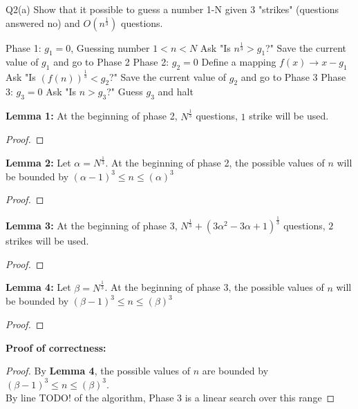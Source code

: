 \begin{problem}
  {Q2(a)}
  Show that it possible to guess a number 1-N given 3 "strikes" (questions answered no) and $O(n^{\frac{1}{3}})$ questions. \\
  \begin{algorithmic}[1]
    \STATE Phase 1: $g_1 = 0$, Guessing number $1 < n < N$
    \STATE Ask "Is $ n^{\frac{1}{3}} > g_1$?"
    \STATE Save the current value of $g_1$ and go to Phase 2
    \ENDIF
    \ENDFOR
    \STATE Phase 2: $g_2 = 0$
    \STATE Define a mapping $f(x) \rightarrow x - g_1$
    \STATE Ask "Is $(f(n))^{\frac{1}{3}} < g_2$?"
    \STATE Save the current value of $g_2$ and go to Phase 3
    \ENDIF
    \ENDFOR
    \STATE Phase 3: $g_3 = 0$
    \STATE Ask "Is $n > g_3$?"
    \STATE Guess $g_3$ and halt
    \ENDIF
    \ENDFOR
  \end{algorithmic}
  \textbf{Lemma 1:} At the beginning of phase 2, $N^{\frac{1}{3}}$ questions, $1$ strike will be used. \\
  \begin{proof}
  \end{proof}
  \textbf{Lemma 2:} Let $\alpha = N^{\frac{1}{3}}$. At the beginning of phase 2, the possible values of $n$ will be bounded by $(\alpha - 1)^3 \leq n \leq (\alpha)^3$ \\
  \begin{proof}
  \end{proof}
  \textbf{Lemma 3:} At the beginning of phase 3, $N^{\frac{1}{3}} + (3\alpha^2 - 3\alpha + 1)^{\frac{1}{3}}$ questions, $2$ strikes will be used. \\
  \begin{proof}
  \end{proof}
  \textbf{Lemma 4:} Let $\beta = N^{\frac{1}{3}}$. At the beginning of phase 3, the possible values of $n$ will be bounded by $(\beta - 1)^3 \leq n \leq (\beta)^3$ \\
  \begin{proof}
  \end{proof}
  \textbf{Proof of correctness:}
  \begin{proof}
  By \textbf{Lemma 4}, the possible values of $n$ are bounded by $(\beta - 1)^3 \leq n \leq (\beta)^3$. \\
  By line TODO! of the algorithm, Phase 3 is a linear search over this range

\end{proof}
\end{problem}
